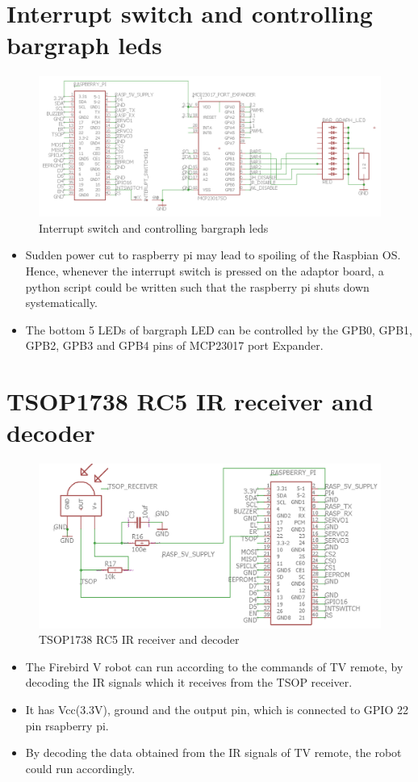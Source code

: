 \documentclass[a4paper,12pt,oneside]{book}
\begin{document}
\section{\textbf{Interrupt switch and controlling bargraph leds}}
\begin{figure}[h]
	\includegraphics[width=1\textwidth]{interupt_bargraph}
	\caption{Interrupt switch and controlling bargraph leds}
\end{figure}
\hfill
\begin{itemize}
	\item {Sudden power cut to raspberry pi may lead to spoiling of the Raspbian OS. Hence, whenever the interrupt switch is pressed on the adaptor board, a python script could be written such that the raspberry pi shuts down systematically.}
	\item {The bottom 5 LEDs of bargraph LED can be controlled by the GPB0,  GPB1, GPB2, GPB3 and GPB4 pins of MCP23017 port Expander.}
\end{itemize}
\pagebreak

\section{\textbf{TSOP1738 RC5 IR receiver and decoder}}
\begin{figure}[h]
	\includegraphics[width=1\textwidth]{tsop}
	\caption{TSOP1738 RC5 IR receiver and decoder}
\end{figure}
\hfill
\begin{itemize}
	\item {The Firebird V robot can run according to the commands of TV remote, by decoding the IR signals which it receives from the TSOP receiver. }
	\item {It has Vcc(3.3V), ground and the output pin, which is connected to GPIO 22 pin rsapberry pi.}
	\item {By decoding the data obtained from the IR signals of TV remote, the robot could run accordingly.}
\end{itemize}
\pagebreak
\end{document}
